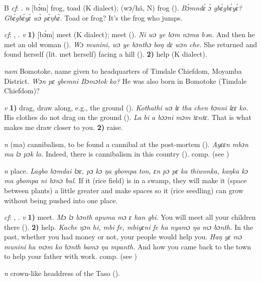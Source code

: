 \begin{letter}{B}
 \textit{cf}: . \textit{n} [bɔ̀m] frog, toad (K dialect); (wɔ/hã, N) frog (\citealt{Pichl1967}). \textit{Bɔ̀mndɛ́ ɔ̀ gbɛ́gbɛ́yɛ̀? Gbɛ́gbɛ́yɛ̀ wɔ̀ pɛ́ŋhɛ̀.} Toad or frog? It's the frog who jumps.

 \textit{cf}: , . \textit{v} \textbf{1)} [bɔ́m] meet (K dialect); meet (\citealt{Pichl1967}). \textit{Ni wɔ ye bɔm nɔma bən.} And then he met an old woman (\citealt{Pichl1967}). \textit{Wɔ munini, wɔ ye bɔnthɔ boŋ dɛ wɔn che.} She returned and found herself (lit. met herself) facing a hill (\citealt{Pichl1967}). \textbf{2)} help (K dialect).

 \textit{nam} Bomotoke, name given to headquarters of Timdale Chiefdom, Moyamba District. \textit{Wɔn pɛ gbemni Bɔmɔtok ko?} He was also born in Bomotoke (Timdale Chiefdom)?

 \textit{v} \textbf{1)} drag, draw along, e.g., the ground (\citealt{Pichl1967}). \textit{Kothathi wɔ lɛ tha chen bɔnni lɛɛ ko.} His clothes do not drag on the ground (\citealt{Pichl1967}). \textit{La bi a bɔɔni mɔm tɛntɛ.} That is what makes me draw closer to you. \textbf{2)} raise.

 \textit{n} (ma) cannibalism, to be found a cannibal at the post-mortem (\citealt{Pichl1967}). \textit{Ayɛɛn mbɔn ma lɔ pɔk lo.} Indeed, there is cannibalism in this country (\citealt{Pichl1967}). comp.  (see ) 

 \textit{n} place. \textit{Lagbo bɔmdai lɔɛ, pɔ kɔ ŋa gbompa ton, ɛn pɔ pɛ ka thiwonka, kaŋka kɔ ma gbompa ni bɔnɔ bul.} If it (rice field) is in a swamp, they will make it (space between plants) a little greater and make spaces so it (rice seedling) can grow without being pushed into one place. 

 \textit{cf}: , . \textit{v} \textbf{1)} meet. \textit{Mɔ lɔ bɔnth apuma mɔ ɛ han gbi}. You will meet all your children there (\citealt{Pichl1967}). \textbf{2)} help. \textit{Kache ŋɔn hi, mbi fe, mbiyɛni fe ha nyamɔ ŋa mɔ bɔnth.} In the past, whether you had money or not, your people would help you. \textit{Haŋ yɛ mɔ munini ha mɔm ko bɔnth bamɔ ŋa mpanth.} And how you came back to the town to help your father with work. comp.  (see )

 \textit{n} crown-like headdress of the Taso (\citealt{Pichl1967}).


\end{letter}
